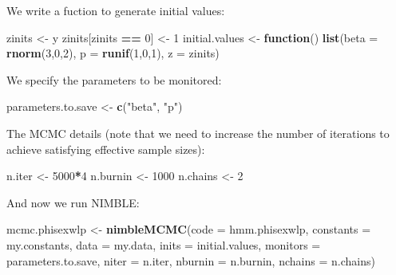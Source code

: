 \documentclass[
  12pt,
]{krantz}
\newenvironment{Shaded}{\begin{snugshade}}{\end{snugshade}}
\newcommand{\AttributeTok}[1]{\textcolor[rgb]{0.13,0.29,0.53}{#1}}
\newcommand{\ControlFlowTok}[1]{\textcolor[rgb]{0.13,0.29,0.53}{\textbf{#1}}}
\newcommand{\DecValTok}[1]{\textcolor[rgb]{0.00,0.00,0.81}{#1}}
\newcommand{\FunctionTok}[1]{\textcolor[rgb]{0.13,0.29,0.53}{\textbf{#1}}}
\newcommand{\NormalTok}[1]{#1}
\newcommand{\OtherTok}[1]{\textcolor[rgb]{0.56,0.35,0.01}{#1}}
\newcommand{\SpecialCharTok}[1]{\textcolor[rgb]{0.81,0.36,0.00}{\textbf{#1}}}
\newcommand{\StringTok}[1]{\textcolor[rgb]{0.31,0.60,0.02}{#1}}
\begin{document}
We write a fuction to generate initial values:

\begin{Shaded}
\begin{Highlighting}[]
\NormalTok{zinits }\OtherTok{\textless{}{-}}\NormalTok{ y}
\NormalTok{zinits[zinits }\SpecialCharTok{==} \DecValTok{0}\NormalTok{] }\OtherTok{\textless{}{-}} \DecValTok{1}
\NormalTok{initial.values }\OtherTok{\textless{}{-}} \ControlFlowTok{function}\NormalTok{() }\FunctionTok{list}\NormalTok{(}\AttributeTok{beta =} \FunctionTok{rnorm}\NormalTok{(}\DecValTok{3}\NormalTok{,}\DecValTok{0}\NormalTok{,}\DecValTok{2}\NormalTok{),}
                                  \AttributeTok{p =} \FunctionTok{runif}\NormalTok{(}\DecValTok{1}\NormalTok{,}\DecValTok{0}\NormalTok{,}\DecValTok{1}\NormalTok{),}
                                  \AttributeTok{z =}\NormalTok{ zinits)}
\end{Highlighting}
\end{Shaded}

We specify the parameters to be monitored:

\begin{Shaded}
\begin{Highlighting}[]
\NormalTok{parameters.to.save }\OtherTok{\textless{}{-}} \FunctionTok{c}\NormalTok{(}\StringTok{"beta"}\NormalTok{, }\StringTok{"p"}\NormalTok{)}
\end{Highlighting}
\end{Shaded}

The MCMC details (note that we need to increase the number of iterations to achieve satisfying effective sample sizes):

\begin{Shaded}
\begin{Highlighting}[]
\NormalTok{n.iter }\OtherTok{\textless{}{-}} \DecValTok{5000}\SpecialCharTok{*}\DecValTok{4}
\NormalTok{n.burnin }\OtherTok{\textless{}{-}} \DecValTok{1000}
\NormalTok{n.chains }\OtherTok{\textless{}{-}} \DecValTok{2}
\end{Highlighting}
\end{Shaded}

And now we run NIMBLE:

\begin{Shaded}
\begin{Highlighting}[]
\NormalTok{mcmc.phisexwlp }\OtherTok{\textless{}{-}} \FunctionTok{nimbleMCMC}\NormalTok{(}\AttributeTok{code =}\NormalTok{ hmm.phisexwlp, }
                             \AttributeTok{constants =}\NormalTok{ my.constants,}
                             \AttributeTok{data =}\NormalTok{ my.data,              }
                             \AttributeTok{inits =}\NormalTok{ initial.values,}
                             \AttributeTok{monitors =}\NormalTok{ parameters.to.save,}
                             \AttributeTok{niter =}\NormalTok{ n.iter,}
                             \AttributeTok{nburnin =}\NormalTok{ n.burnin, }
                             \AttributeTok{nchains =}\NormalTok{ n.chains)}
\end{Highlighting}
\end{Shaded}
\end{document}
